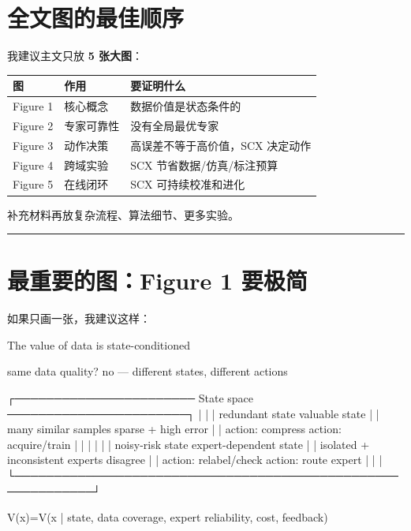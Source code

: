 \documentclass[
  12pt,
]{ctexart}
\newenvironment{Shaded}{}{}
\newcommand{\NormalTok}[1]{#1}
\begin{document}
\section{全文图的最佳顺序}\label{ux5168ux6587ux56feux7684ux6700ux4f73ux987aux5e8f}

我建议主文只放 \textbf{5 张大图}：

\begin{longtable}[]{@{}lll@{}}
\toprule\noalign{}
图 & 作用 & 要证明什么 \\
\midrule\noalign{}
\endhead
\bottomrule\noalign{}
\endlastfoot
Figure 1 & 核心概念 & 数据价值是状态条件的 \\
Figure 2 & 专家可靠性 & 没有全局最优专家 \\
Figure 3 & 动作决策 & 高误差不等于高价值，SCX 决定动作 \\
Figure 4 & 跨域实验 & SCX 节省数据/仿真/标注预算 \\
Figure 5 & 在线闭环 & SCX 可持续校准和进化 \\
\end{longtable}

补充材料再放复杂流程、算法细节、更多实验。

\begin{center}\rule{0.5\linewidth}{0.5pt}\end{center}

\section{最重要的图：Figure 1
要极简}\label{ux6700ux91cdux8981ux7684ux56fefigure-1-ux8981ux6781ux7b80}

如果只画一张，我建议这样：

\begin{Shaded}
\begin{Highlighting}[]
\NormalTok{                 The value of data is state{-}conditioned}

\NormalTok{          same data quality? no — different states, different actions}

\NormalTok{ ┌─────────────────────── State space ───────────────────────┐}
\NormalTok{ |                                                            |}
\NormalTok{ |   redundant state                  valuable state           |}
\NormalTok{ |   many similar samples             sparse + high error      |}
\NormalTok{ |   action: compress                 action: acquire/train    |}
\NormalTok{ |                                                            |}
\NormalTok{ |                                                            |}
\NormalTok{ |   noisy{-}risk state                 expert{-}dependent state   |}
\NormalTok{ |   isolated + inconsistent          experts disagree         |}
\NormalTok{ |   action: relabel/check            action: route expert     |}
\NormalTok{ |                                                            |}
\NormalTok{ └────────────────────────────────────────────────────────────┘}

\NormalTok{             V(x)=V(x | state, data coverage, expert reliability, cost, feedback)}
\end{Highlighting}
\end{Shaded}
\end{document}
